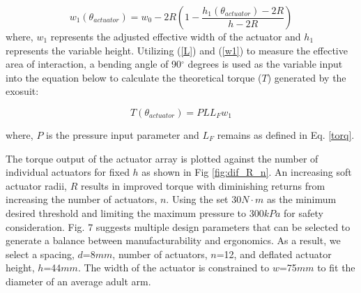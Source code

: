 \documentclass[letterpaper, 10 pt, conference]{ieeeconf}  %
\begin{document}
\begin{equation}\label{w1}
	w_1(\theta_{actuator})  = w_0-2R(1-\frac{h_1(\theta_{actuator})-2R}{h-2R})
\end{equation}
where, $w_1$ represents the adjusted effective width of the actuator and $h_1$ represents the variable height. Utilizing (\ref{L}) and (\ref{w1}) to measure the effective area of interaction, a bending angle of 90$^{\circ}$ degrees is used as the variable input into the equation below to calculate the theoretical torque ($T$) generated by the exosuit:

\begin{equation}\label{torque}
	T(\theta_{actuator}) = PLL_Fw_1
\end{equation}

where, $P$ is the pressure input parameter and $L_F$ remains as defined in Eq. \ref{torq}. 





The torque output of the actuator array is plotted against the number of individual actuators for fixed $h$ as shown in Fig \ref{fig:dif_R_n}. An increasing soft actuator radii, $R$ results in improved torque with diminishing returns from increasing the number of actuators, $n$. Using the set 30$N{\cdot}m$ as the minimum desired threshold and limiting the maximum pressure to 300$kPa$ for safety consideration. Fig. 7 suggests multiple design parameters that can be selected to generate a balance between manufacturability and ergonomics. As a result, we select a spacing,  $d$=8$mm$, number of actuators, $n$=12, and deflated actuator height, $h$=44$mm$. The width of the actuator is constrained to $w$=75$mm$ to fit the diameter of an average adult arm.
\end{document}
